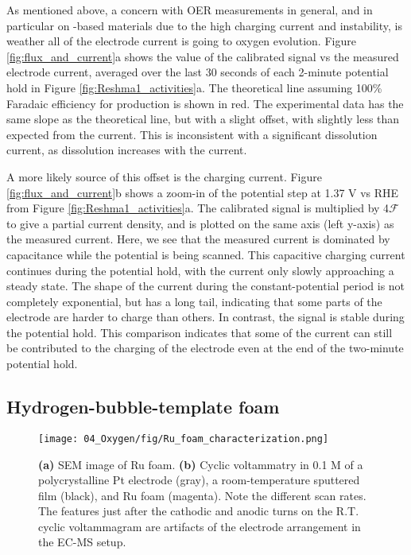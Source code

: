 As mentioned above, a concern with OER measurements in general, and in particular on -based materials due to the high charging current and instability, is weather all of the electrode current is going to oxygen evolution. Figure \ref{fig:flux_and_current}a shows the value of the calibrated  signal vs the measured electrode current, averaged over the last 30 seconds of each 2-minute potential hold in Figure \ref{fig:Reshma1_activities}a. The theoretical line assuming 100\% Faradaic efficiency for  production is shown in red. The experimental data has the same slope as the theoretical line, but with a slight offset, with slightly less  than expected from the current. This is inconsistent with a significant dissolution current, as  dissolution increases with the current\cite{Cherevko2016}.

A more likely source of this offset is the charging current. Figure \ref{fig:flux_and_current}b shows a zoom-in of the potential step at 1.37 V vs RHE from Figure \ref{fig:Reshma1_activities}a. The calibrated  signal is multiplied by 4$\mathcal{F}$ to give a partial current density, and is plotted on the same axis (left y-axis) as the measured current. Here, we see that the measured current is dominated by capacitance while the potential is being scanned. This capacitive charging current continues during the potential hold, with the current only slowly approaching a steady state. The shape of the current during the constant-potential period is not completely exponential, but has a long tail, indicating that some parts of the electrode are harder to charge than others. In contrast, the  signal is stable during the potential hold. This comparison indicates that some of the current can still be contributed to the charging of the electrode even at the end of the two-minute potential hold.

\subsection{Hydrogen-bubble-template  foam}

\begin{figure}[h!]
	\centering
	\texttt{[image: 04\_Oxygen/fig/Ru\_foam\_characterization.png]}
	\caption{\textbf{(a)} SEM image of Ru foam. \textbf{(b)} Cyclic voltammatry in 0.1 M  of a polycrystalline Pt electrode (gray), a room-temperature sputtered  film (black), and Ru foam (magenta). Note the different scan rates. The features just after the cathodic and anodic turns on the R.T.  cyclic voltammagram are artifacts of the electrode arrangement in the EC-MS setup.}
	\label{fig:Ru_foam_char}
\end{figure}

